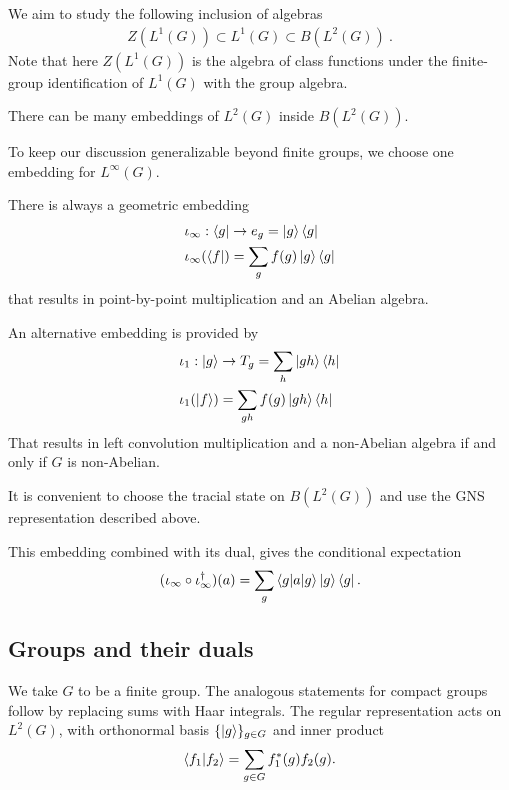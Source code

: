 \documentclass[11pt]{article}
\newcommand{\nn}{\nonumber}
\begin{document}
We aim to study the following inclusion of algebras
\begin{align}
 Z(L^1(G))\subset L^1(G)\subset B(L^2(G))\ .
\end{align}
Note that here $Z(L^1(G))$ is the algebra of class functions under the finite-group identification of $L^1(G)$ with the group algebra.


There can be many embeddings of $L^2(G)$ inside $B(L^2(G))$. 


To keep our discussion generalizable beyond finite groups, we choose one embedding for $L^\infty(G)$.

There is always a geometric embedding 
\begin{align}
    &\iota_\infty:\bra{g}\to e_g=\ket{g}\bra{g}\nn\\
    &\iota_\infty(\bra{f})=\sum_g f(g)\ket{g}\bra{g}
\end{align}
that results in point-by-point multiplication and an Abelian algebra. 

An alternative embedding is provided by
\begin{align}
    &\iota_1:\ket{g}\to T_g=\sum_h \ket{g h}\bra{h}\nn\\
    &\iota_1(\ket{f})=\sum_{gh}f(g)\ket{g h}\bra{h}
\end{align}
That results in left convolution multiplication and a non-Abelian algebra if and only if $G$ is non-Abelian.

It is convenient to choose the tracial state on $B(L^2(G))$ and use the GNS representation described above.


This embedding combined with its dual, gives the conditional expectation
\begin{align}
(\iota_\infty\circ\iota_\infty^\dagger)(a)=\sum_g \braket{g|a|g}\ket{g}\bra{g}.
\end{align}


\subsection{Groups and their duals}

We take $G$ to be a finite group. The analogous statements for compact groups
follow by replacing sums with Haar integrals. The regular representation acts on
$L^2(G)$, with orthonormal basis $\{\ket g\}_{g\in G}$ and inner product
\begin{eqnarray}
    \braket{f_1|f_2}=\sum_{g\in G}f_1^*(g) f_2(g).
\end{eqnarray}
\end{document}

